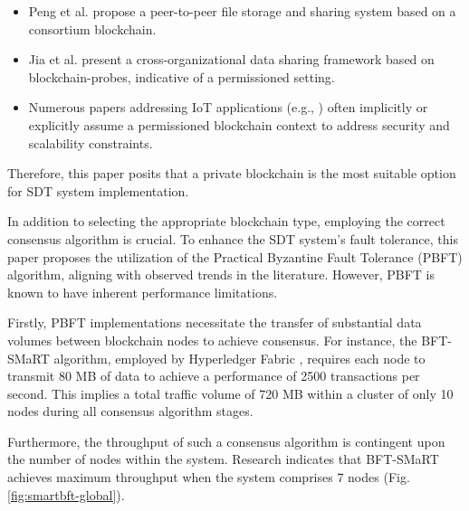 \documentclass[10pt]{llncs}
\begin{document}
\begin{itemize}
    \item Peng et al. \cite{Peng2023} propose a peer-to-peer file storage and sharing system based on a consortium blockchain.
    \item Jia et al. \cite{Jia2023} present a cross-organizational data sharing framework based on blockchain-probes, indicative of a permissioned setting.
    \item Numerous papers addressing IoT applications (e.g., \cite{Ai2022,Gupta2022}) often implicitly or explicitly assume a permissioned blockchain context to address security and scalability constraints.
\end{itemize}

Therefore, this paper posits that a private blockchain is the most suitable option for SDT system implementation.

In addition to selecting the appropriate blockchain type, employing the correct consensus algorithm is crucial. 
To enhance the SDT system's fault tolerance, this paper proposes the utilization of the Practical Byzantine Fault Tolerance (PBFT) algorithm, aligning with observed trends in the literature. 
However, PBFT is known to have inherent performance limitations.

Firstly, PBFT implementations necessitate the transfer of substantial data volumes between blockchain nodes to achieve consensus. 
For instance, the BFT-SMaRT algorithm, employed by Hyperledger Fabric \cite{barger2021byzantine}, requires each node to transmit 80 MB of data to achieve a performance of 2500 transactions per second. 
This implies a total traffic volume of 720 MB within a cluster of only 10 nodes during all consensus algorithm stages.

Furthermore, the throughput of such a consensus algorithm is contingent upon the number of nodes within the system. 
Research \cite{barger2021byzantine} indicates that BFT-SMaRT achieves maximum throughput when the system comprises 7 nodes (Fig. \ref{fig:smartbft-global}).
\end{document}
